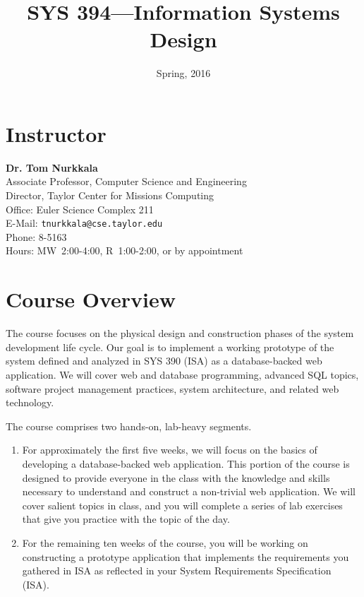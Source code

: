 \documentclass{article}
\date{Spring, 2016}
\title{SYS 394---Information Systems Design}
\renewcommand\maketitle\relax
\begin{document}
\maketitle

\section{Instructor}
\label{sec:orgheadline1}
\textbf{Dr. Tom Nurkkala}\\
Associate Professor, Computer Science and Engineering\\
Director, Taylor Center for Missions Computing\\
Office: Euler Science Complex 211\\
E-Mail: \texttt{tnurkkala@cse.taylor.edu}\\
Phone: 8-5163\\
Hours: MW~2:00-4:00, R~1:00-2:00, or by appointment\\
\section{Course Overview}
\label{sec:orgheadline2}
The course focuses on the physical design and construction phases
of the system development life cycle.
Our goal is to implement a working prototype
of the system defined and analyzed in SYS 390 (ISA)
as a database-backed web application.
We will cover web and database programming, advanced SQL topics,
software project management practices, system architecture,
and related web technology.

The course comprises two hands-on, lab-heavy segments.
\begin{enumerate}
\item For approximately the first five weeks, we will focus on the basics of developing a
database-backed web application. This portion of the course is designed to provide
everyone in the class with the knowledge and skills necessary to understand and
construct a non-trivial web application. We will cover salient topics in class, and you
will complete a series of lab exercises that give you practice with the topic of the
day.
\item For the remaining ten weeks of the course, you will be working on constructing a
prototype application that implements the requirements you gathered in ISA as reflected
in your System Requirements Specification (ISA).
\end{enumerate}
\end{document}

